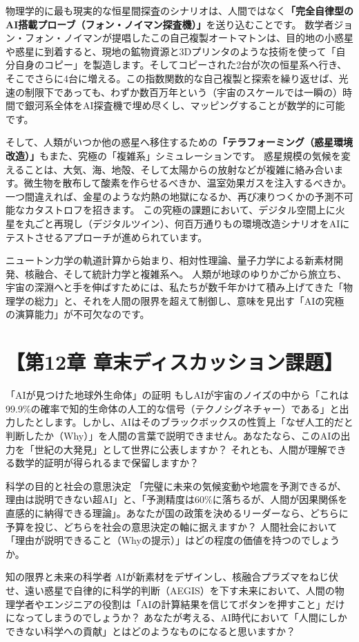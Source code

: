物理学的に最も現実的な恒星間探査のシナリオは、人間ではなく\textbf{「完全自律型のAI搭載プローブ（フォン・ノイマン探査機）」}を送り込むことです。 数学者ジョン・フォン・ノイマンが提唱したこの自己複製オートマトンは、目的地の小惑星や惑星に到着すると、現地の鉱物資源と3Dプリンタのような技術を使って「自分自身のコピー」を製造します。そしてコピーされた2台が次の恒星系へ行き、そこでさらに4台に増える。この指数関数的な自己複製と探索を繰り返せば、光速の制限下であっても、わずか数百万年という（宇宙のスケールでは一瞬の）時間で銀河系全体をAI探査機で埋め尽くし、マッピングすることが数学的に可能です。

そして、人類がいつか他の惑星へ移住するための\textbf{「テラフォーミング（惑星環境改造）」}もまた、究極の「複雑系」シミュレーションです。 惑星規模の気候を変えることは、大気、海、地殻、そして太陽からの放射などが複雑に絡み合います。微生物を散布して酸素を作らせるべきか、温室効果ガスを注入するべきか。一つ間違えれば、金星のような灼熱の地獄になるか、再び凍りつくかの予測不可能なカタストロフを招きます。 この究極の課題において、デジタル空間上に火星を丸ごと再現し（デジタルツイン）、何百万通りもの環境改造シナリオをAIにテストさせるアプローチが進められています。

ニュートン力学の軌道計算から始まり、相対性理論、量子力学による新素材開発、核融合、そして統計力学と複雑系へ。 人類が地球のゆりかごから旅立ち、宇宙の深淵へと手を伸ばすためには、私たちが数千年かけて積み上げてきた「物理学の総力」と、それを人間の限界を超えて制御し、意味を見出す「AIの究極の演算能力」が不可欠なのです。

\section*{【第12章 章末ディスカッション課題】}

「AIが見つけた地球外生命体」の証明 もしAIが宇宙のノイズの中から「これは99.9\%の確率で知的生命体の人工的な信号（テクノシグネチャー）である」と出力したとします。しかし、AIはそのブラックボックスの性質上「なぜ人工的だと判断したか（Why）」を人間の言葉で説明できません。あなたなら、このAIの出力を「世紀の大発見」として世界に公表しますか？ それとも、人間が理解できる数学的証明が得られるまで保留しますか？

科学の目的と社会の意思決定 「完璧に未来の気候変動や地震を予測できるが、理由は説明できない超AI」と、「予測精度は60\%に落ちるが、人間が因果関係を直感的に納得できる理論」。あなたが国の政策を決めるリーダーなら、どちらに予算を投じ、どちらを社会の意思決定の軸に据えますか？ 人間社会において「理由が説明できること（Whyの提示）」はどの程度の価値を持つのでしょうか。

知の限界と未来の科学者 AIが新素材をデザインし、核融合プラズマをねじ伏せ、遠い惑星で自律的に科学的判断（AEGIS）を下す未来において、人間の物理学者やエンジニアの役割は「AIの計算結果を信じてボタンを押すこと」だけになってしまうのでしょうか？ あなたが考える、AI時代において「人間にしかできない科学への貢献」とはどのようなものになると思いますか？




